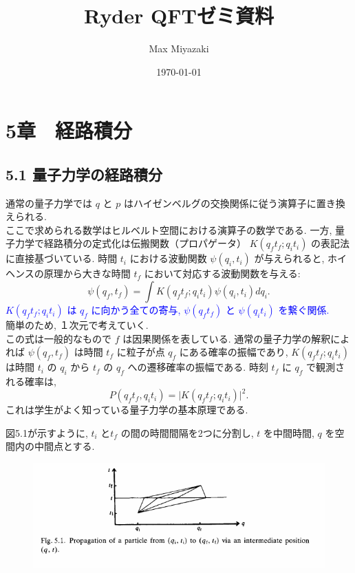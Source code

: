\documentclass[a4paper,12pt]{article}
\title{Ryder QFTゼミ資料}
\date{\today}
\author{Max Miyazaki}
\begin{document}
\maketitle
\section*{\textrm{5章　経路積分}}
\subsection*{\textrm{5.1 量子力学の経路積分}}
通常の量子力学では $q$ と $p$ はハイゼンベルグの交換関係に従う演算子に置き換えられる.\\
ここで求められる数学はヒルベルト空間における演算子の数学である. 一方, 量子力学で経路積分の定式化は伝搬関数（プロパゲータ） $K(q_{f}t_{f}; q_{i}t_{i})$ の表記法に直接基づいている. 時間 $t_{i}$ における波動関数 $\psi(q_i, t_i)$ が与えられると, ホイヘンスの原理から大きな時間 $t_f$ において対応する波動関数を与える:
\begin{equation*}
    \psi(q_f, t_f) = \int K(q_{f}t_{f}; q_{i}t_{i})\psi(q_i, t_i)dq_i. \tag{5.1}
\end{equation*}
\textcolor{blue}{$K(q_{f}t_{f}; q_{i}t_{i})$ は $q_{f}$ に向かう全ての寄与, $\psi(q_{f}t_{f})$ と $\psi(q_{i}t_{i})$ を繋ぐ関係.}\\
簡単のため, １次元で考えていく.\\
この式は一般的なもので $f$ は因果関係を表している. 通常の量子力学の解釈によれば $\psi(q_f, t_f)$ は時間 $t_f$ に粒子が点 $q_f$ にある確率の振幅であり, $K(q_{f}t_{f}; q_{i}t_{i})$ は時間 $t_i$ の $q_i$ から $t_f$ の $q_f$ への遷移確率の振幅である.
時刻 $t_f$ に $q_f$ で観測される確率は,
\begin{equation*}
    P(q_{f}t_{f}, q_{i}t_{i}) = \lvert K(q_{f}t_{f}; q_{i}t_{i}) \rvert^2.
\end{equation*}
これは学生がよく知っている量子力学の基本原理である.\par
図5.1が示すように, $t_i$ と$t_f$ の間の時間間隔を2つに分割し, $t$ を中間時間, $q$ を空間内の中間点とする.

\begin{figure}[H]
    \centering
    \includegraphics[width=15cm]{figure/fig5-1.png}
\end{figure}
\end{document}
